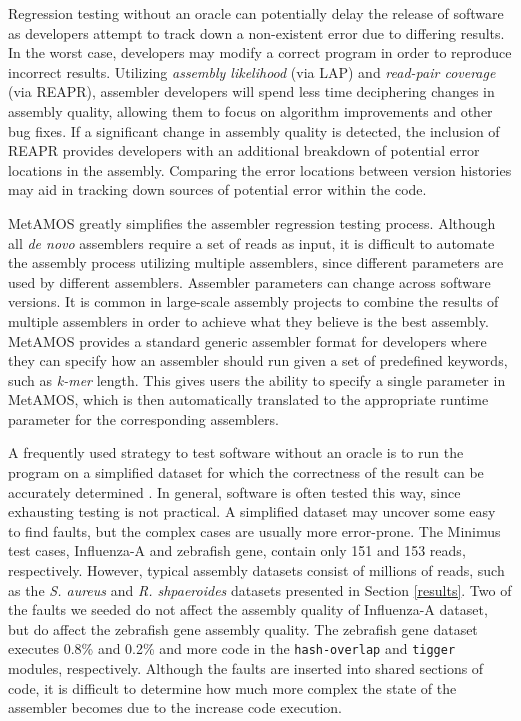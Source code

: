 \documentclass[12pt,\mydriver]{thesis}
\begin{document}
Regression testing without an oracle can potentially delay the release of software as developers attempt to track down a non-existent error due to differing results.
In the worst case, developers may modify a correct program in order to reproduce incorrect results.
Utilizing \emph{assembly likelihood} (via LAP) and \emph{read-pair coverage} (via REAPR), assembler developers will spend less time deciphering changes in assembly quality, allowing them to focus on algorithm improvements and other bug fixes.
If a significant change in assembly quality is detected, the inclusion of REAPR provides developers with an additional breakdown of potential error locations in the assembly.
Comparing the error locations between version histories may aid in tracking down sources of potential error within the code.

MetAMOS greatly simplifies the assembler regression testing process.
Although all \emph{de novo} assemblers require a set of reads as input, it is difficult to automate the assembly process utilizing multiple assemblers, since different parameters are used by different assemblers.
Assembler parameters can change across software versions.
It is common in large-scale assembly projects to combine the results of multiple assemblers in order to achieve what they believe is the best assembly.
MetAMOS provides a standard generic assembler format for developers where they can specify how an assembler should run given a set of predefined keywords, such as \emph{k-mer} length.
This gives users the ability to specify a single parameter in MetAMOS, which is then automatically translated to the appropriate runtime parameter for the corresponding assemblers.


A frequently used strategy to test software without an oracle is to run the program on a simplified dataset for which the correctness of the result can be accurately determined \cite{weyuker1982testing}.
In general, software is often tested this way, since exhausting testing is not practical.
A simplified dataset may uncover some easy to find faults, but the complex cases are usually more error-prone.
The Minimus test cases, Influenza-A and zebrafish gene, contain only 151 and 153 reads, respectively.
However, typical assembly datasets consist of millions of reads, such as the \emph{S. aureus} and \emph{R. shpaeroides} datasets presented in Section \ref{results}.
Two of the faults we seeded do not affect the assembly quality of Influenza-A dataset, but do affect the zebrafish gene assembly quality.
The zebrafish gene dataset executes 0.8\% and 0.2\% and more code in the \texttt{hash-overlap} and \texttt{tigger} modules, respectively.
Although the faults are inserted into shared sections of code, it is difficult to determine how much more complex the state of the assembler becomes due to the increase code execution.
\end{document}
